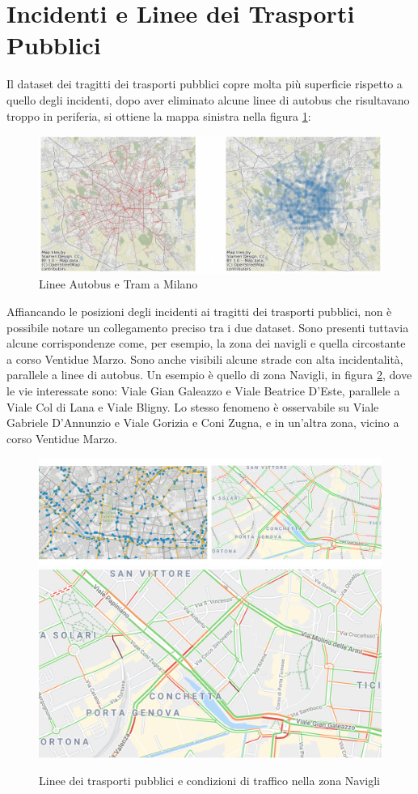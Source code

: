 \documentclass[a4paper]{report}
\begin{document}
\section{Incidenti e Linee dei Trasporti Pubblici}

Il dataset dei tragitti dei trasporti pubblici copre molta più superficie rispetto a 
quello degli incidenti, dopo aver eliminato alcune linee di autobus che risultavano 
troppo in periferia, si ottiene la mappa sinistra nella figura \ref{fig:geo-trasporti}: 

\begin{figure}
    \includegraphics[width=\linewidth]{../src/atm/linee_atm.png}
    \caption{Linee Autobus e Tram a Milano}
    \label{fig:geo-trasporti}
\end{figure}

Affiancando le posizioni degli incidenti ai tragitti dei trasporti pubblici, 
non è possibile notare un collegamento preciso tra i due dataset. Sono presenti tuttavia alcune 
corrispondenze come, per esempio, la zona dei navigli e quella circostante a 
corso Ventidue Marzo. 
Sono anche visibili alcune strade con alta incidentalità, parallele a linee di autobus. 
Un esempio è quello di zona Navigli, in figura \ref{fig:navigli}, dove le vie interessate sono:
Viale Gian Galeazzo e Viale Beatrice D'Este, parallele a Viale Col di Lana e Viale Bligny.
Lo stesso fenomeno è osservabile su Viale Gabriele D'Annunzio e Viale Gorizia e Coni Zugna, 
e in un'altra zona, vicino a corso Ventidue Marzo.

\begin{figure}
    \includegraphics[width=0.51\linewidth]{../src/atm/navigli.png}
    \includegraphics[width=0.49\linewidth]{../src/codice_per_dati/googleMaps/navigli.png}
    \caption{Linee dei trasporti pubblici e condizioni di traffico nella zona Navigli}
    \label{fig:navigli}
\end{figure}
\end{document}
